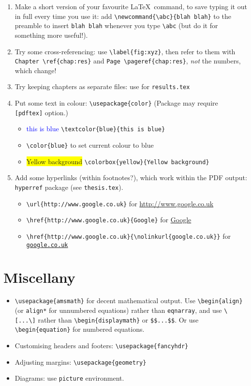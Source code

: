 \documentclass[a4paper]{article}
\begin{document}
\begin{enumerate}
\item Make a short version of your favourite \LaTeX\ command, to save typing it out in full every time you use it: add \verb=\newcommand{\abc}{blah blah}= to the preamble to insert \verb=blah blah= whenever you type \verb=\abc= (but do it for something more useful!).
\item Try some cross-referencing: use \verb=\label{fig:xyz}=, then refer to them with \verb=Chapter \ref{chap:res}= and \verb=Page \pageref{chap:res}=, \emph{not} the numbers, which change!
\item Try keeping chapters as separate files: use \verb== for \verb=results.tex=
\item Put some text in colour: \verb=\usepackage{color}=  (Package may require \verb=[pdftex]= option.)
\begin{itemize}
\item \textcolor{blue}{this is blue} \verb=\textcolor{blue}{this is blue}= 
\item \verb=\color{blue}= \color{blue} to set current colour to blue \color{black}
\item \colorbox{yellow}{Yellow background} \verb=\colorbox{yellow}{Yellow background}=
\end{itemize}
\item Add some hyperlinks (within footnotes?), which work within the PDF output: \verb=hyperref= package (see \verb=thesis.tex=).
\begin{itemize}
\item \verb=\url{http://www.google.co.uk}= for \url{http://www.google.co.uk}
\item \verb=\href{http://www.google.co.uk}{Google}= for \href{http://www.google.co.uk}{Google}
\item \verb=\href{http://www.google.co.uk}{\nolinkurl{google.co.uk}}= for \href{http://www.google.co.uk}{\nolinkurl{google.co.uk}}
\end{itemize}
\end{enumerate}

\section{Miscellany}

\begin{itemize}
\item \verb=\usepackage{amsmath}= for decent mathematical output. Use \verb=\begin{align}= (or \verb=align*= for unnumbered equations) rather than \verb=eqnarray=, and use \verb=\[...\]= rather than \verb=\begin{displaymath}= or \verb=$$...$$=. Or use \verb=\begin{equation}= for numbered equations.
\item Customising headers and footers: \verb=\usepackage{fancyhdr}=
\item Adjusting margins: \verb=\usepackage{geometry}=
\item Diagrams: use \verb=picture= environment.
\end{itemize}
\end{document}
